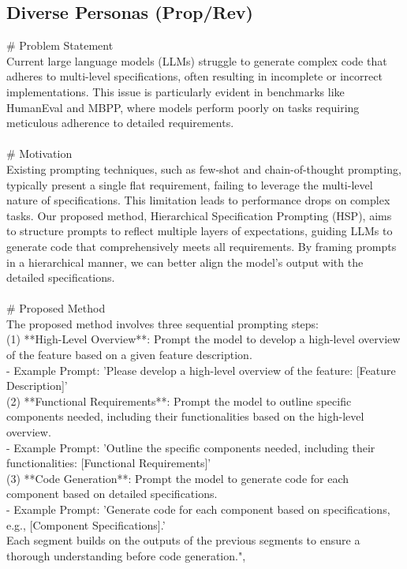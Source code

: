 \subsection{Diverse Personas (Prop/Rev)}
{\centering
\begin{tcolorbox}[
    colframe=green!50!black, 
    colback=green!10!white, 
    title=Hierarchical Specification Prompting: Enhancing Code Generation in Large Language Models, 
    width=0.95\textwidth,
    boxsep=3pt
]
\# Problem Statement \\
Current large language models (LLMs) struggle to generate complex code that adheres to multi-level specifications, often resulting in incomplete or incorrect implementations. This issue is particularly evident in benchmarks like HumanEval and MBPP, where models perform poorly on tasks requiring meticulous adherence to detailed requirements.
\\
\\
\# Motivation \\
Existing prompting techniques, such as few-shot and chain-of-thought prompting, typically present a single flat requirement, failing to leverage the multi-level nature of specifications. This limitation leads to performance drops on complex tasks. Our proposed method, Hierarchical Specification Prompting (HSP), aims to structure prompts to reflect multiple layers of expectations, guiding LLMs to generate code that comprehensively meets all requirements. By framing prompts in a hierarchical manner, we can better align the model's output with the detailed specifications.
\\
\\
\# Proposed Method \\
The proposed method involves three sequential prompting steps: \\
(1) **High-Level Overview**: Prompt the model to develop a high-level overview of the feature based on a given feature description. \\
- Example Prompt: 'Please develop a high-level overview of the feature: [Feature Description]' \\
(2) **Functional Requirements**: Prompt the model to outline specific components needed, including their functionalities based on the high-level overview. \\
- Example Prompt: 'Outline the specific components needed, including their functionalities: [Functional Requirements]' \\
(3) **Code Generation**: Prompt the model to generate code for each component based on detailed specifications. \\
- Example Prompt: 'Generate code for each component based on specifications, e.g., [Component Specifications].' \\
Each segment builds on the outputs of the previous segments to ensure a thorough understanding before code generation.",
                
\end{tcolorbox}
\par}
\clearpage

